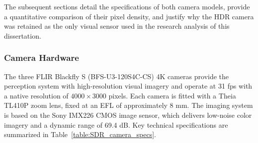 \documentclass{erauthesis}
\begin{document}
The subsequent sections detail the specifications of both camera models, provide a quantitative comparison of their pixel density, and justify why the HDR camera was retained as the only visual sensor used in the research analysis of this dissertation.

\subsubsection{Camera Hardware} 
 

The three FLIR Blackfly S (BFS-U3-120S4C-CS) 4K cameras provide the perception system with high-resolution visual imagery and operate at 31 fps with a native resolution of $4000 \times 3000$ pixels. 
Each camera is fitted with a Theia TL410P zoom lens, fixed at an \ac{EFL} of approximately 8 mm. 
The imaging system is based on the Sony IMX226 \ac{CMOS} image sensor, which delivers low-noise color imagery and a dynamic range of 69.4 dB. Key technical specifications are summarized in Table~\ref{table:SDR_camera_specs}.
\end{document}
